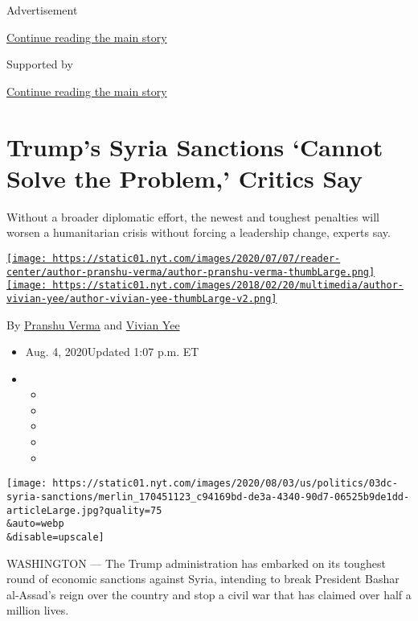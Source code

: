 Advertisement

\protect\hyperlink{after-top}{Continue reading the main story}

Supported by

\protect\hyperlink{after-sponsor}{Continue reading the main story}

\hypertarget{trumps-syria-sanctions-cannot-solve-the-problem-critics-say}{%
\section{Trump's Syria Sanctions `Cannot Solve the Problem,' Critics
Say}\label{trumps-syria-sanctions-cannot-solve-the-problem-critics-say}}

Without a broader diplomatic effort, the newest and toughest penalties
will worsen a humanitarian crisis without forcing a leadership change,
experts say.

\href{https://www.nytimes.com/by/pranshu-verma}{\texttt{[image: https://static01.nyt.com/images/2020/07/07/reader-center/author-pranshu-verma/author-pranshu-verma-thumbLarge.png]}}\href{https://www.nytimes.com/by/vivian-yee}{\texttt{[image: https://static01.nyt.com/images/2018/02/20/multimedia/author-vivian-yee/author-vivian-yee-thumbLarge-v2.png]}}

By \href{https://www.nytimes.com/by/pranshu-verma}{Pranshu Verma} and
\href{https://www.nytimes.com/by/vivian-yee}{Vivian Yee}

\begin{itemize}
\item
  Aug. 4, 2020Updated 1:07 p.m. ET
\item
  \begin{itemize}
  \item
  \item
  \item
  \item
  \item
  \end{itemize}
\end{itemize}

\texttt{[image: https://static01.nyt.com/images/2020/08/03/us/politics/03dc-syria-sanctions/merlin\_170451123\_c94169bd-de3a-4340-90d7-06525b9de1dd-articleLarge.jpg?quality=75\\\&auto=webp\\\&disable=upscale]}

WASHINGTON --- The Trump administration has embarked on its toughest
round of economic sanctions against Syria, intending to break President
Bashar al-Assad's reign over the country and stop a civil war that has
claimed over half a million lives.

